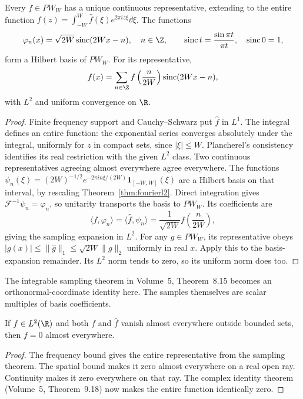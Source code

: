 \begin{theorem}\label{thm:sampling}
Every $f\in PW_W$ has a unique continuous representative, extending to the entire function
$f(z)=\int_{-W}^W\hat f(\xi)e^{2\pi iz\xi}\dd\xi$.
The functions
\[
\varphi_n(x)=\sqrt{2W}\operatorname{sinc}(2Wx-n),\quad n\in\Z,
\qquad\operatorname{sinc}t=\frac{\sin\pi t}{\pi t},\quad\operatorname{sinc}0=1,
\]
form a Hilbert basis of $PW_W$. For its representative,
\[
f(x)=\sum_{n\in\Z}f\left(\frac n{2W}\right)\operatorname{sinc}(2Wx-n),
\]
with $L^2$ and uniform convergence on $\R$.
\end{theorem}
\begin{proof}
Finite frequency support and Cauchy--Schwarz put $\hat f$ in $L^1$. The integral defines an entire function: the exponential series converges absolutely under the integral, uniformly for $z$ in compact sets, since $|\xi|\le W$. Plancherel's consistency identifies its real restriction with the given $L^2$ class. Two continuous representatives agreeing almost everywhere agree everywhere.
The functions $\psi_n(\xi)=(2W)^{-1/2}e^{-2\pi in\xi/(2W)}\mathbf1_{[-W,W]}(\xi)$ are a Hilbert basis on that interval, by rescaling Theorem~\ref{thm:fourierl2}. Direct integration gives $\mathcal F^{-1}\psi_n=\varphi_n$, so unitarity transports the basis to $PW_W$. Its coefficients are
\[
\langle f,\varphi_n\rangle=\langle\hat f,\psi_n\rangle
=\frac1{\sqrt{2W}}f\left(\frac n{2W}\right),
\]
giving the sampling expansion in $L^2$. For any $g\in PW_W$, its representative obeys
$|g(x)|\le\|\hat g\|_1\le\sqrt{2W}\|g\|_2$ uniformly in real $x$. Apply this to the basis-expansion remainder. Its $L^2$ norm tends to zero, so its uniform norm does too.
\end{proof}

The integrable sampling theorem in Volume~5, Theorem~8.15 becomes an orthonormal-coordinate identity here. The samples themselves are scalar multiples of basis coefficients.

\begin{corollary}\label{cor:nocompact}
If $f\in L^2(\R)$ and both $f$ and $\hat f$ vanish almost everywhere outside bounded sets, then $f=0$ almost everywhere.
\end{corollary}
\begin{proof}
The frequency bound gives the entire representative from the sampling theorem. The spatial bound makes it zero almost everywhere on a real open ray. Continuity makes it zero everywhere on that ray. The complex identity theorem (Volume~5, Theorem~9.18) now makes the entire function identically zero.
\end{proof}

